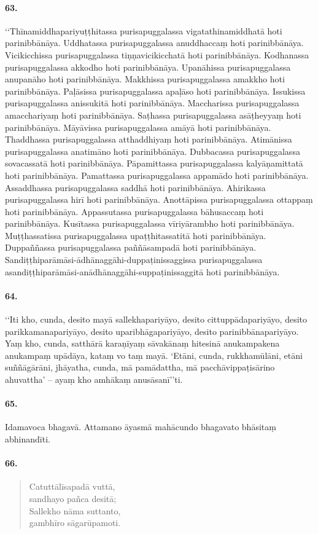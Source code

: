 \paragraph{63.} ‘‘Thīnamiddhapariyuṭṭhitassa purisapuggalassa vigatathinamiddhatā hoti parinibbānāya. Uddhatassa purisapuggalassa anuddhaccaṃ hoti parinibbānāya. Vicikicchissa purisapuggalassa tiṇṇavicikicchatā hoti parinibbānāya. Kodhanassa purisapuggalassa akkodho hoti parinibbānāya. Upanāhissa purisapuggalassa anupanāho hoti parinibbānāya. Makkhissa purisapuggalassa amakkho hoti parinibbānāya. Paḷāsissa purisapuggalassa apaḷāso hoti parinibbānāya. Issukissa purisapuggalassa anissukitā hoti parinibbānāya. Maccharissa purisapuggalassa amacchariyaṃ hoti parinibbānāya. Saṭhassa purisapuggalassa asāṭheyyaṃ hoti parinibbānāya. Māyāvissa purisapuggalassa amāyā hoti parinibbānāya. Thaddhassa purisapuggalassa atthaddhiyaṃ hoti parinibbānāya. Atimānissa purisapuggalassa anatimāno hoti parinibbānāya. Dubbacassa purisapuggalassa sovacassatā hoti parinibbānāya. Pāpamittassa purisapuggalassa kalyāṇamittatā hoti parinibbānāya. Pamattassa purisapuggalassa appamādo hoti parinibbānāya. Assaddhassa purisapuggalassa saddhā hoti parinibbānāya. Ahirikassa purisapuggalassa hirī hoti parinibbānāya. Anottāpissa purisapuggalassa ottappaṃ hoti parinibbānāya. Appassutassa purisapuggalassa bāhusaccaṃ hoti parinibbānāya. Kusītassa purisapuggalassa vīriyārambho hoti parinibbānāya. Muṭṭhassatissa purisapuggalassa upaṭṭhitassatitā hoti parinibbānāya. Duppaññassa purisapuggalassa paññāsampadā hoti parinibbānāya. Sandiṭṭhiparāmāsi-ādhānaggāhi-duppaṭinissaggissa purisapuggalassa asandiṭṭhiparāmāsi-anādhānaggāhi-suppaṭinissaggitā hoti parinibbānāya.

\paragraph{64.} ‘‘Iti kho, cunda, desito mayā sallekhapariyāyo, desito cittuppādapariyāyo, desito parikkamanapariyāyo, desito uparibhāgapariyāyo, desito parinibbānapariyāyo. Yaṃ kho, cunda, satthārā karaṇīyaṃ sāvakānaṃ hitesinā anukampakena anukampaṃ upādāya, kataṃ vo taṃ mayā. ‘Etāni, cunda, rukkhamūlāni, etāni suññāgārāni, jhāyatha, cunda, mā pamādattha, mā pacchāvippaṭisārino ahuvattha’ – ayaṃ kho amhākaṃ anusāsanī’’ti.

\paragraph{65.} Idamavoca bhagavā. Attamano āyasmā mahācundo bhagavato bhāsitaṃ abhinandīti.

\paragraph{66.}\begin{verse}
  Catuttālīsapadā vuttā, \\sandhayo pañca desitā;\\
  Sallekho nāma suttanto, \\gambhīro sāgarūpamoti.\\
\end{verse}

